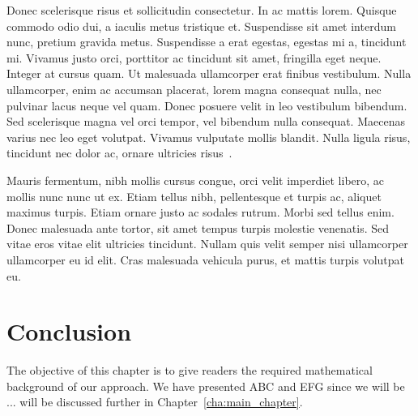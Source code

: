 Donec scelerisque risus et sollicitudin consectetur. In ac mattis lorem. Quisque commodo odio dui, a iaculis metus tristique et. Suspendisse sit amet interdum nunc, pretium gravida metus. Suspendisse a erat egestas, egestas mi a, tincidunt mi. Vivamus justo orci, porttitor ac tincidunt sit amet, fringilla eget neque. Integer at cursus quam. Ut malesuada ullamcorper erat finibus vestibulum. Nulla ullamcorper, enim ac accumsan placerat, lorem magna consequat nulla, nec pulvinar lacus neque vel quam. Donec posuere velit in leo vestibulum bibendum. Sed scelerisque magna vel orci tempor, vel bibendum nulla consequat. Maecenas varius nec leo eget volutpat. Vivamus vulputate mollis blandit. Nulla ligula risus, tincidunt nec dolor ac, ornare ultricies risus~\cite{Schmidt1993aa}. \newline

Mauris fermentum, nibh mollis cursus congue, orci velit imperdiet libero, ac mollis nunc nunc ut ex. Etiam tellus nibh, pellentesque et turpis ac, aliquet maximus turpis. Etiam ornare justo ac sodales rutrum. Morbi sed tellus enim. Donec malesuada ante tortor, sit amet tempus turpis molestie venenatis. Sed vitae eros vitae elit ultricies tincidunt. Nullam quis velit semper nisi ullamcorper ullamcorper eu id elit. Cras malesuada vehicula purus, et mattis turpis volutpat eu.



\section{Conclusion}
\label{sec:background_conclusion}

The objective of this chapter is to give readers the required mathematical background of our approach. We have presented ABC and EFG since we will be ...  will be discussed further in Chapter~\ref{cha:main_chapter}.

